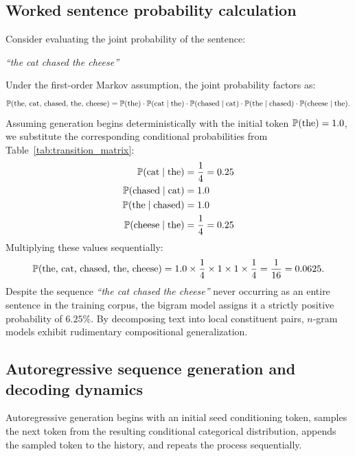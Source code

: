\documentclass[../../main.tex]{subfiles}
\begin{document}
\subsection{Worked sentence probability calculation}
Consider evaluating the joint probability of the sentence:
\begin{center}
\textit{``the cat chased the cheese''}
\end{center}
Under the first-order Markov assumption, the joint probability factors as:
\begin{equation}
\label{eq:joint_calc_formula}
\mathbb{P}(\text{the, cat, chased, the, cheese}) = \mathbb{P}(\text{the}) \cdot \mathbb{P}(\text{cat} \mid \text{the}) \cdot \mathbb{P}(\text{chased} \mid \text{cat}) \cdot \mathbb{P}(\text{the} \mid \text{chased}) \cdot \mathbb{P}(\text{cheese} \mid \text{the}).
\end{equation}
Assuming generation begins deterministically with the initial token $\mathbb{P}(\text{the}) = 1.0$, we substitute the corresponding conditional probabilities from Table~\ref{tab:transition_matrix}:
\begin{align}
\mathbb{P}(\text{cat} \mid \text{the}) &= \frac{1}{4} = 0.25 \notag \\
\mathbb{P}(\text{chased} \mid \text{cat}) &= 1.0 \notag \\
\mathbb{P}(\text{the} \mid \text{chased}) &= 1.0 \notag \\
\mathbb{P}(\text{cheese} \mid \text{the}) &= \frac{1}{4} = 0.25 \notag
\end{align}
Multiplying these values sequentially:
\begin{equation}
\label{eq:joint_exact_result}
\mathbb{P}(\text{the, cat, chased, the, cheese}) = 1.0 \times \frac{1}{4} \times 1 \times 1 \times \frac{1}{4} = \frac{1}{16} = 0.0625.
\end{equation}
Despite the sequence \textit{``the cat chased the cheese''} never occurring as an entire sentence in the training corpus, the bigram model assigns it a strictly positive probability of $6.25\%$. By decomposing text into local constituent pairs, $n$-gram models exhibit rudimentary compositional generalization.

\subsection{Autoregressive sequence generation and decoding dynamics}
Autoregressive generation begins with an initial seed conditioning token, samples the next token from the resulting conditional categorical distribution, appends the sampled token to the history, and repeats the process sequentially. 
\end{document}
